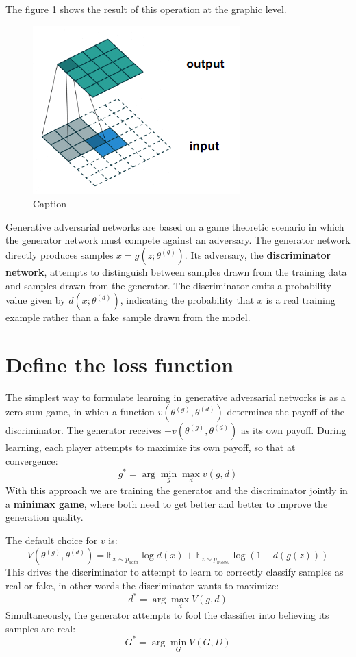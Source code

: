 The figure \ref{fig:TConvRes} shows the result of this operation at the graphic level.

\begin{figure}[!ht]
    \centering
    \includegraphics[width=0.5\linewidth]{img/GAN/results.png}
    \caption{Caption}
    \label{fig:TConvRes}
\end{figure}

Generative adversarial networks are based on a game theoretic scenario in which
the generator network must compete against an adversary. The generator network
directly produces samples $x = g(z; \theta^{(g)})$. Its adversary, the
\textbf{discriminator network}, attempts to distinguish between samples drawn
from the training data and samples drawn from the generator. The discriminator
emits a probability value given by $d(x; \theta^{(d)})$, indicating the
probability that $x$ is a real training example rather than a fake sample drawn
from the model.
\section{Define the loss function}
The simplest way to formulate learning in generative adversarial networks is as
a zero-sum game, in which a function $v(\theta^{(g)}, \theta^{(d)})$ determines
the payoff of the discriminator. The generator receives $- v(\theta^{(g)}, \theta^{(d)})$
as its own payoff. During learning, each player attempts to maximize its own
payoff, so that at convergence:
\begin{equation}
    g^\ast = \arg \min_{g} \max_{d} v(g, d)
\end{equation}
With this approach we are training the generator and the discriminator jointly
in a \textbf{minimax game}, where both need to get better and better to improve
the generation quality.

The default choice for $v$ is:
\begin{equation}
    V(\theta^{(g)}, \theta^{(d)}) = \mathbb{E}_{x \sim p_{data}} \log d(x) + \mathbb{E}_{z \sim p_{model}} \log(1 - d(g(z)))
\end{equation}
This drives the discriminator to attempt to learn to correctly classify samples
as real or fake, in other words the discriminator wants to maximize:
\begin{equation*}
    d^\ast = \arg \max_d V(g,d)
\end{equation*}
Simultaneously, the generator attempts to fool the classifier into believing its
samples are real:
\begin{equation*}
    G^\ast = \arg \min_G V(G,D)
\end{equation*}

